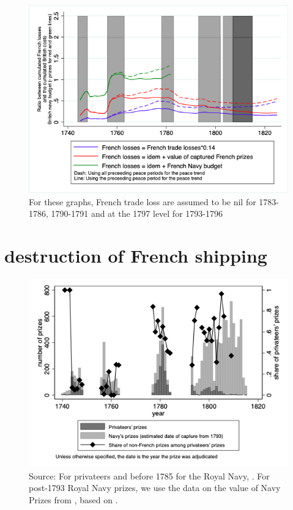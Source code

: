 \documentclass[12pt,a4paper,notitlepage,english]{article}
\newcommand{\source}[1]{\caption*{\footnotesize Source: {#1}} }
\begin{document}
\begin{appendix}
\begin{center}
\begin{figure}[h!]
		\includegraphics[scale=0.4]{Ratio_BR_Expenditures_Annual_LossL.png}
		\source{See text and \cite[pp. 570-587]{mitchell1988}}
	    \caption*{For these graphs, French trade loss are assumed to be nil for 1783-1786, 1790-1791 and at the 1797 level for 1793-1796}
	\end{figure}
\end{center}

\section{destruction of French shipping}
\begin{center}
	\begin{figure}[h!]
		\caption{Ships captured by Great-Britain}
		\label{Prizes}
		\centering
		\includegraphics[scale=0.7]{Prizes.png}
		\source{For privateers and before 1785 for the Royal Navy, \cite{Starkey1990,Hillmann2011}. For post-1793 Royal Navy prizes, we use the data on the value of Navy Prizes from \cite{Benjamin2009}, based on \cite{Hill1998}.}
	\end{figure}
\end{center}


\end{appendix}
\end{document}
